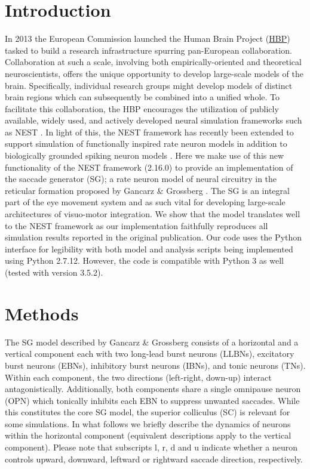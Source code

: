\documentclass[10pt,a4paper,onecolumn]{article}
\begin{document}
\section{Introduction}\label{introduction}

In 2013 the European Commission launched the Human Brain Project
(\href{https://www.humanbrainproject.eu/en/}{HBP}) tasked to build a
research infrastructure spurring pan-European collaboration.
Collaboration at such a scale, involving both empirically-oriented and
theoretical neuroscientists, offers the unique opportunity to develop
large-scale models of the brain. Specifically, individual research
groups might develop models of distinct brain regions which can
subsequently be combined into a unified whole. To facilitate this
collaboration, the HBP encourages the utilization of publicly available,
widely used, and actively developed neural simulation frameworks such as
NEST \autocite{Gewaltig2007}. In light of this, the NEST framework has
recently been extended to support simulation of functionally inspired
rate neuron models in addition to biologically grounded spiking neuron
models \autocite{Hahne2017}. Here we make use of this new functionality
of the NEST framework (2.16.0) to provide an implementation of the
saccade generator (SG); a rate neuron model of neural circuitry in the
reticular formation proposed by Gancarz \& Grossberg
\autocite{Gancarz1998}. The SG is an integral part of the eye movement
system \autocite{Grossberg2012} and as such vital for developing
large-scale architectures of visuo-motor integration. We show that the
model translates well to the NEST framework as our implementation
faithfully reproduces all simulation results reported in the original
publication. Our code uses the Python interface \autocite{Eppler2008}
for legibility with both model and analysis scripts being implemented
using Python 2.7.12. However, the code is compatible with Python 3 as
well (tested with version 3.5.2).

\section{Methods}\label{methods}

The SG model described by Gancarz \& Grossberg \autocite{Gancarz1998}
consists of a horizontal and a vertical component each with two
long-lead burst neurons (LLBNs), excitatory burst neurons (EBNs),
inhibitory burst neurons (IBNs), and tonic neurons (TNs). Within each
component, the two directions (left-right, down-up) interact
antagonistically. Additionally, both components share a single omnipause
neuron (OPN) which tonically inhibits each EBN to suppress unwanted
saccades. While this constitutes the core SG model, the superior
colliculus (SC) is relevant for some simulations. In what follows we
briefly describe the dynamics of neurons within the horizontal component
(equivalent descriptions apply to the vertical component). Please note
that subscripts \(\mathrm{l}\), \(\mathrm{r}\), \(\mathrm{d}\) and
\(\mathrm{u}\) indicate whether a neuron controls upward, downward,
leftward or rightward saccade direction, respectively.
\end{document}
